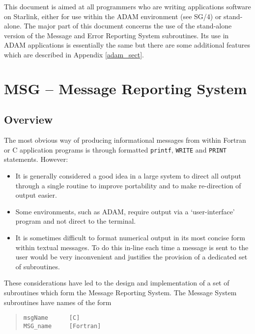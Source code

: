 \documentclass[twoside,11pt]{article}
\newcommand{\htmlref}[2]{#1}
\newcommand{\latex}[1]{#1}
\newcommand{\xref}[3]{#1}
\newcommand{\xlabel}[1]{}
\renewcommand{\_}{\texttt{\symbol{95}}}
\newcommand{\func}[1]{\texttt{#1}}
\begin{document}
This document is aimed at all programmers who are writing applications software
on Starlink, either for use within the 
\xref{ADAM environment}{sg4}{}\latex{ (see SG/4)}
or stand-alone.
The major part of this document concerns the use of the stand-alone version of
the Message and Error Reporting System subroutines.
Its use in ADAM applications is essentially the same but there are some
\htmlref
{additional features}{adam_sect}\latex{ which are described in Appendix \ref{adam_sect}}.

\section{\xlabel{msg_message_reporting_system}MSG -- Message Reporting System \xlabel{msg}}

\subsection{\xlabel{overview}Overview}

The most obvious way of producing informational messages from within 
Fortran or C application programs is through formatted \func{printf},
\func{WRITE} and \func{PRINT}
statements.
However:
\begin{itemize}
\item It is generally considered a good idea in a large system to direct
all output through a single routine to improve portability and to make
re-direction of output easier.
\item Some environments, such as ADAM, require output via a `user-interface'
program and not direct to the terminal.
\item It is sometimes difficult to format numerical output in its most
concise form within textual messages.
To do this in-line each time a message is sent to the user would be very
inconvenient and justifies the provision of a dedicated set of subroutines. 
\end{itemize} 
These considerations have led to the design and implementation of a set of
subroutines which form the Message Reporting System.
The Message System subroutines have names of the form

\begin {quote}
\begin {small}
\begin{verbatim}
msgName      [C]
MSG_name     [Fortran]
\end{verbatim}
\end {small}
\end {quote}
\end{document}

